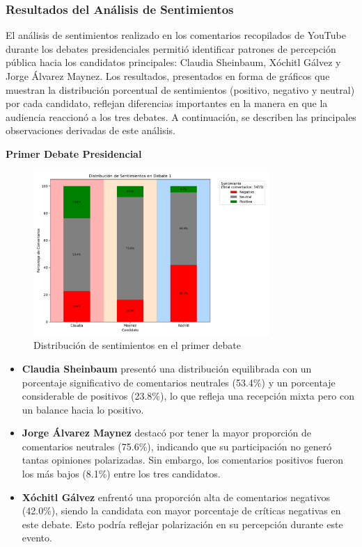 \documentclass[10pt, a4paper]{article}
\begin{document}
	\subsubsection{Resultados del Análisis de Sentimientos}
	El análisis de sentimientos realizado en los comentarios recopilados de YouTube durante los debates presidenciales permitió identificar patrones de percepción pública hacia los candidatos principales: Claudia Sheinbaum, Xóchitl Gálvez y Jorge Álvarez Maynez. Los resultados, presentados en forma de gráficos que muestran la distribución porcentual de sentimientos (positivo, negativo y neutral) por cada candidato, reflejan diferencias importantes en la manera en que la audiencia reaccionó a los tres debates. A continuación, se describen las principales observaciones derivadas de este análisis.
	
	\textbf{Primer Debate Presidencial}
	
	\begin{figure}[h!] %
		\centering
		\includegraphics[width=0.8\textwidth]{sA_debate1.pdf} %
		\caption{Distribución de sentimientos en el primer debate} %
		\label{fig:sA_debate1} %
	\end{figure}
	
	\begin{itemize}
		\item \textbf{Claudia Sheinbaum} presentó una distribución equilibrada con un porcentaje significativo de comentarios neutrales (53.4\%) y un porcentaje considerable de positivos (23.8\%), lo que refleja una recepción mixta pero con un balance hacia lo positivo.
		\item \textbf{Jorge Álvarez Maynez} destacó por tener la mayor proporción de comentarios neutrales (75.6\%), indicando que su participación no generó tantas opiniones polarizadas. Sin embargo, los comentarios positivos fueron los más bajos (8.1\%) entre los tres candidatos.
		\item \textbf{Xóchitl Gálvez} enfrentó una proporción alta de comentarios negativos (42.0\%), siendo la candidata con mayor porcentaje de críticas negativas en este debate. Esto podría reflejar polarización en su percepción durante este evento.
	\end{itemize}
	
\end{document}
